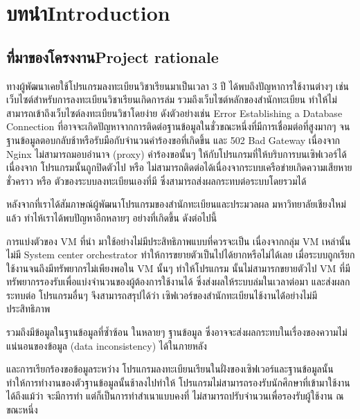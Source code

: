 \chapter{\ifcpe บทนำ\else Introduction\fi}

\section{\ifcpe ที่มาของโครงงาน\else Project rationale\fi}

ทางผู้พัฒนาเคยใช้โปรแกรมลงทะเบียนวิชาเรียนมาเป็นเวลา 3 ปี ได้พบถึงปัญหาการใช้งานต่างๆ เช่น เว็บไซต์สำหรับการลงทะเบียนวิชาเรียนเกิดการล่ม 
รวมถึงเว็บไซต์หลักของสำนักทะเบียน ทำให้ไม่สามารถเข้าถึงเว็บไซต์ลงทะเบียนวิชาโดยง่าย ดังตัวอย่างเช่น Error Establishing a Database Connection ที่อาจจะเกิดปัญหาจากการติดต่อฐานข้อมูลในชั่วขณะหนึ่งที่มีการเชื่อมต่อที่สูงมากๆ จนฐานข้อมูลตอบกลับช้าหรือรับมือกับจำนวนคำร้องขอที่เกิดขึ้น และ 502 Bad Gateway เนื่องจาก Nginx ไม่สามารถมอบอำนาจ (proxy) คำร้องขอนั้นๆ ให้กับโปรแกรมที่ให้บริบการบนเซิฟเวอร์ได้เนื่องจาก โปรแกรมนั้นถูกปิดตัวไป หรือ ไม่สามารถติดต่อได้เนื่องจากระบบเครือข่ายเกิดความเสียหายชั่วคราว หรือ ตัวของระบบลงทะเบียนเองที่มี ซึ่งสามารถส่งผลกระทบต่อระบบโดยรวมได้

หลังจากที่เราได้สัมภาษณ์ผู้พัฒนาโปรแกรมของสำนักทะเบียนและประมวลผล มหาวิทยาลัยเชียงใหม่แล้ว ทำไห้เราได้พบปัญหาอีกหลายๆ อย่างที่เกิดขึ้น ดังต่อไปนี้

การแบ่งตัวของ VM \cite{vm} ที่นำ มาใช้อย่างไม่มีประสิทธิภาพแบบที่ควรจะเป็น
เนื่องจากกลุ่ม VM เหล่านั้นไม่มี System center orchestrator \cite{sco} ทำให้การขยายตัวเป็นไปได้ยากหรือไม่ได้เลย เมื่อระบบถูกเรียกใช้งานจนถึงมีทรัพยากรไม่เพียงพอใน VM นั้นๆ ทำให้โปรแกรม นั้นไม่สามารกขยายตัวไป VM ที่มีทรัพยากรรองรับเพื่อแบ่งจำนวนของผู้ต้องการใช้งานได้ ซึ่งส่งผลให้ระบบล่มในเวลาต่อมา และส่งผลกระทบต่อ โปรแกรมอื่นๆ 
 จึงสามารถสรุปได้ว่า เซิฟเวอร์ของสำนักทะเบียนไช้งานได้่อย่างไม่มีประสิทธิภาพ

รวมถึงมีข้อมูลในฐานข้อมูลที่ซ้ำซ้อน ในหลายๆ ฐานข้อมูล ซึ่งอาจจะส่งผลกระทบในเรื่องของความไม่แน่นอนของข้อมูล (data inconsistency) ได้ในภายหลัง

และการเรียกร้องขอข้อมูลระหว่าง โปรแกรมลงทะเบียนเรียนในฝั่งของเซิฟเวอร์และฐานข้อมูลนั้น ทำให้การทำงานของตัวฐานข้อมูลนั้นช้าลงไปทำให้ โปรแกรมไม่สามารถรองรับนักศึกษาที่เข้ามาใช้งานได้ถึงแม้ว่า จะมีการทำ แต่ก็เป็นการทำสำเนาแบบคงที่ ไม่สามารถปรับจำนวนเพื่อรองรับผู้ใช้งาน ณ ขณะหนึ่ง

